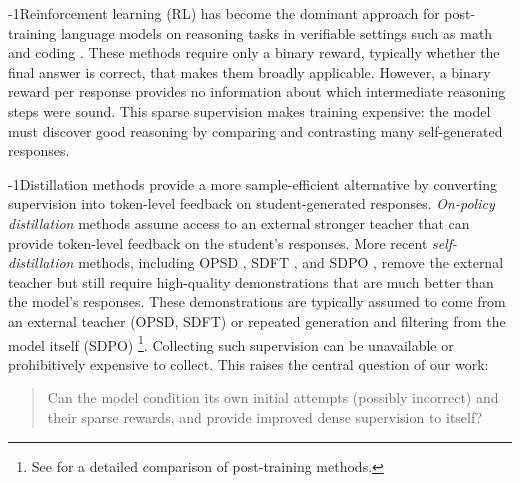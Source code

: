 
\looseness-1Reinforcement learning (RL) has become the dominant approach for post-training language models on reasoning tasks in verifiable settings such as math and coding \citep{shao2024deepseekmath,Guo_2025,chen2025minimax,zheng2025group}.
These methods require only a binary reward, typically whether the final answer is correct, that makes them broadly applicable. However, a binary reward per response provides no information about which intermediate reasoning steps were sound. This sparse supervision makes training expensive: the model must discover good reasoning by comparing and contrasting many self-generated responses.







\looseness-1Distillation methods provide a more sample-efficient alternative by converting supervision into token-level feedback on student-generated responses. \emph{On-policy distillation} methods \citep{agarwal2024onpolicy,gu2024minillm,boizard2024uld,minixhofer2025cross,lu2025onpolicydistillation} assume access to an external stronger teacher that can provide token-level feedback on the student's responses. More recent \emph{self-distillation} methods, including OPSD \citep{zhao2026self}, SDFT \citep{shenfeld2026self}, and SDPO \citep{hubotter2026reinforcement}, remove the external teacher but still require high-quality demonstrations that are much better than the model's responses.
These demonstrations are typically assumed to come from an external teacher (OPSD, SDFT) or repeated generation and filtering from the model itself (SDPO) \footnote{See  for a detailed comparison of post-training methods.}. Collecting such supervision can be unavailable or prohibitively expensive to collect. This raises the central question of our work:

\begin{quote}
    Can the model condition its own initial attempts (possibly incorrect) and their sparse rewards, and provide improved dense supervision to itself?
\end{quote}







